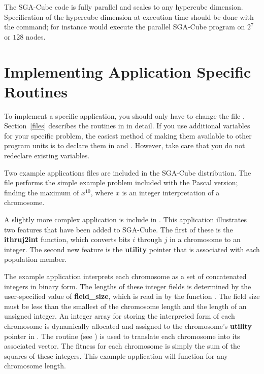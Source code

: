 The SGA-Cube code is fully parallel and scales
to any hypercube dimension.  Specification of the hypercube dimension at 
execution time should be done with the {} command; for instance
{} would execute the parallel SGA-Cube program on $2^7$
or $128$ nodes.

\section{Implementing Application Specific Routines}
\label{app}
To implement a specific application, you should only have to change the file
{}.
Section~\ref{files} describes the routines in {} in detail.
If you use additional variables for your specific problem, the easiest method
of making them available to other program units is to declare them in 
{} and {}.  However, take care that you do not
redeclare existing variables.

Two example applications files are included in the SGA-Cube distribution.  The
file {} performs the simple example problem 
included with the Pascal version; 
finding the maximum of $x^{10}$, where $x$
is an integer interpretation of a chromosome.  

A slightly more complex 
application 
is include in {}.
This application illustrates two features that have been added
to SGA-Cube. The first of these is the {\bf ithruj2int} function,
which converts bits $i$ through $j$ in a chromosome to an integer.
The second new feature is the {\bf utility} pointer that is associated with each population member.

The example application interprets each chromosome as a set 
of concatenated integers in binary form. The lengths of these integer fields is 
determined by the user-specified value of {\bf field\_size}, which is 
read in by the function
{}.  The field size must be less than the smallest of
the chromosome
length and the length of an unsigned integer.  
An integer array for storing the interpreted form of each chromosome
is dynamically allocated and assigned to the chromosome's {\bf utility} pointer
in {}.
The {} routine (see {}) is used to translate 
each chromosome into its associated vector.
The fitness for each chromosome is simply the sum of the squares of these 
integers. This example application will function for any chromosome length. 

